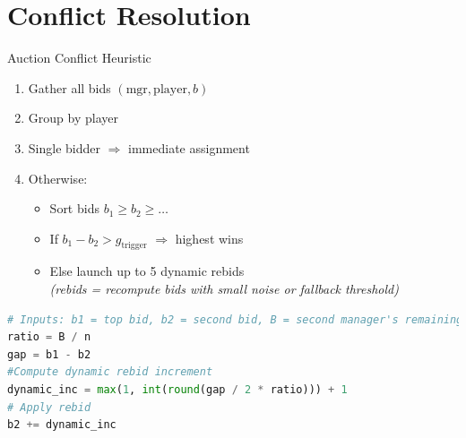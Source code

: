 \documentclass[aspectratio=169]{beamer}
\begin{document}
	\section{Conflict Resolution}
	\begin{frame}[fragile]{Auction Conflict Heuristic}
		\begin{enumerate}\footnotesize
			\item Gather all bids $(\text{mgr}, \text{player}, b)$
			\item Group by player
			\item Single bidder $\Rightarrow$ immediate assignment
			\item Otherwise:
			\begin{itemize}
				\item Sort bids $b_1 \ge b_2 \ge \dots$
				\item If $b_1 - b_2 > g_{\text{trigger}}$ $\Rightarrow$ highest wins
				\item Else launch up to 5 dynamic rebids\\
				\smallskip
				\textit{\footnotesize (rebids = recompute bids with small noise or fallback threshold)}
				
			\end{itemize}
		\end{enumerate}
		\begin{lstlisting}[language=Python, caption={Semplified Dynamic rebid heuristic}, style=mystyle]
# Inputs: b1 = top bid, b2 = second bid, B = second manager's remaining budget, n = number of players still needed
ratio = B / n
gap = b1 - b2
#Compute dynamic rebid increment
dynamic_inc = max(1, int(round(gap / 2 * ratio))) + 1
# Apply rebid
b2 += dynamic_inc
		\end{lstlisting}
		
	\end{frame}
	
\end{document}
